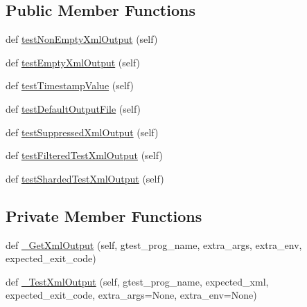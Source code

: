\subsection*{Public Member Functions}
\begin{DoxyCompactItemize}
\item 
def \mbox{\hyperlink{classgoogletest-master_1_1googletest_1_1test_1_1gtest__xml__output__unittest_1_1_g_test_x_m_l_output_unit_test_a053212440539461bff9340e786afcf62}{test\+Non\+Empty\+Xml\+Output}} (self)
\item 
def \mbox{\hyperlink{classgoogletest-master_1_1googletest_1_1test_1_1gtest__xml__output__unittest_1_1_g_test_x_m_l_output_unit_test_ae542ec73d7968e7671eff37ec6d084c7}{test\+Empty\+Xml\+Output}} (self)
\item 
def \mbox{\hyperlink{classgoogletest-master_1_1googletest_1_1test_1_1gtest__xml__output__unittest_1_1_g_test_x_m_l_output_unit_test_a212c880389f4b32f9fd735ecc33661e7}{test\+Timestamp\+Value}} (self)
\item 
def \mbox{\hyperlink{classgoogletest-master_1_1googletest_1_1test_1_1gtest__xml__output__unittest_1_1_g_test_x_m_l_output_unit_test_aacb2d33315ecd50d941f92fd98a4276e}{test\+Default\+Output\+File}} (self)
\item 
def \mbox{\hyperlink{classgoogletest-master_1_1googletest_1_1test_1_1gtest__xml__output__unittest_1_1_g_test_x_m_l_output_unit_test_a44b168164b504366065c2240b5d47bea}{test\+Suppressed\+Xml\+Output}} (self)
\item 
def \mbox{\hyperlink{classgoogletest-master_1_1googletest_1_1test_1_1gtest__xml__output__unittest_1_1_g_test_x_m_l_output_unit_test_a9fe6037ddc703f1feb19b283656b73a2}{test\+Filtered\+Test\+Xml\+Output}} (self)
\item 
def \mbox{\hyperlink{classgoogletest-master_1_1googletest_1_1test_1_1gtest__xml__output__unittest_1_1_g_test_x_m_l_output_unit_test_a8363218acbb93d7847999a89ef2afe25}{test\+Sharded\+Test\+Xml\+Output}} (self)
\end{DoxyCompactItemize}
\subsection*{Private Member Functions}
\begin{DoxyCompactItemize}
\item 
def \mbox{\hyperlink{classgoogletest-master_1_1googletest_1_1test_1_1gtest__xml__output__unittest_1_1_g_test_x_m_l_output_unit_test_accddff249fa5287643f1ef67268abba4}{\+\_\+\+Get\+Xml\+Output}} (self, gtest\+\_\+prog\+\_\+name, extra\+\_\+args, extra\+\_\+env, expected\+\_\+exit\+\_\+code)
\item 
def \mbox{\hyperlink{classgoogletest-master_1_1googletest_1_1test_1_1gtest__xml__output__unittest_1_1_g_test_x_m_l_output_unit_test_ad6f34c7eb20d8362ff512a63758f6ef2}{\+\_\+\+Test\+Xml\+Output}} (self, gtest\+\_\+prog\+\_\+name, expected\+\_\+xml, expected\+\_\+exit\+\_\+code, extra\+\_\+args=None, extra\+\_\+env=None)
\end{DoxyCompactItemize}
